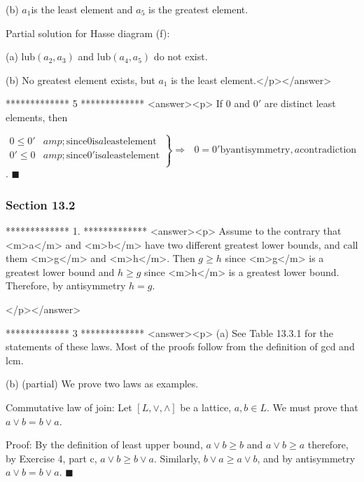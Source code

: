(b)  \(a_1\)is the least element and \(a_5\) is the greatest element. 



     Partial solution for Hasse diagram (f):



(a) \(\text{lub}\left(a_2, a_3\right)\) and \(\text{lub}\left( a_4,a_5\right)\)  do not exist.



(b) No greatest element exists, but \(a_1\) is the least element.</p></answer>


*************
5
*************
<answer><p>  If \(0\) and \(0'\) are distinct least elements, then



  \(\left.
\begin{array}{cc}
 0\leq 0' &amp; \text{since} 0 \text{is} a \text{least} \text{element} \\
 0'\leq 0 &amp; \text{since} 0' \text{is} a \text{least} \text{element} \\
\end{array}
\right\}\Rightarrow \text{  }0=0' \text{by} \text{antisymmetry}, a \text{contradiction}\). $\blacksquare $


\subsubsection{Section 13.2}

*************
1.
*************
<answer><p> Assume to the contrary that <m>a</m> and <m>b</m> have two different greatest lower bounds, and call them <m>g</m> and <m>h</m>. Then
\(g \geq  h\) since <m>g</m> is a greatest lower bound and \(h\geq g\) since <m>h</m> is a greatest lower bound. Therefore, by antisymmetry
\(h = g\).

</p></answer>


*************
3
*************
<answer><p> (a) See Table 13.3.1 for the statements of these laws. Most of the proofs follow from the definition of gcd and lcm. 



 (b) (partial) We prove two laws as examples.



Commutative law of join: Let \([L, \lor  , \land ]\) be a lattice, \(a, b \in L\). We must prove that \(a \lor  b = b \lor  a\). 



Proof: By the definition of least upper bound, \(a \lor  b \geq  b\) and \(a \lor  b \geq a\) therefore, by Exercise 4, part c, \(a \lor  b \geq
 b \lor  a\). Similarly, \(b \lor  a \geq  a \lor  b\), and by antisymmetry \(a \lor  b = b \lor a\).  $\blacksquare $



